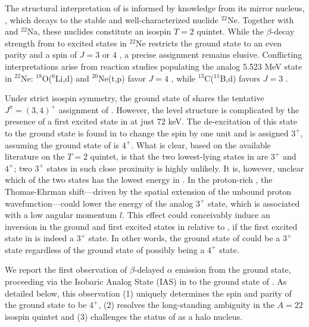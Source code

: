 \documentclass[

reprint,

superscriptaddress,









amsmath,amssymb,
aps,






floatfix,
prl
]{revtex4-2}
\begin{document}
The structural interpretation of \alum{} is informed by knowledge from its mirror nucleus, \flor{}, which decays to the stable and well-characterized \cite{Bas15} nuclide $^{22}$Ne.
Together with \magn{} and $^{22}$Na, these nuclides constitute an isospin $T=2$ quintet.
While the $\beta$-decay strength from \flor{} to excited states in $^{22}$Ne restricts the \flor{} ground state to an even parity and a spin of $J=3$ or $4$ \cite{Dav74}, a precise assignment remains elusive.
Conflicting interpretations arise from reaction studies populating the analog 5.523 MeV state in $^{22}$Ne:
$^{18}$O($^{6}$Li,d) and $^{20}$Ne(t,p) favor $J=4$ \cite{Ana77,Mao94}, while $^{13}$C($^{11}$B,d) favors $J=3$ \cite{Sza83}.

Under strict isospin symmetry, the ground state of \alum{} shares the tentative $J^{\pi}=(3,4)^+$ assignment of \flor{}.
However, the level structure is complicated by the presence of a first excited state in \flor{} at just 72 keV.
The de-excitation of this state to the ground state is found in \cite{Lee07} to change the spin by one unit and is assigned $3^+$, assuming the ground state of \flor{} is $4^+$.
What is clear, based on the available literature on the $T=2$ quintet, is that the two lowest-lying states in \flor{} are $3^+$ and $4^+$; two $3^+$ states in such close proximity is highly unlikely.
It is, however, unclear which of the two states has the lowest energy in \flor{}.
In the proton-rich \alum{}, the Thomas-Ehrman shift—driven by the spatial extension of the unbound proton wavefunction—could lower the energy of the analog $3^+$ state, which is associated with a low angular momentum $l$.
This effect could conceivably induce an inversion in the ground and first excited states in \alum{} relative to \flor{}, if the first excited state in \flor{} is indeed a $3^+$ state.
In other words, the ground state of \alum{} could be a $3^+$ state regardless of the ground state of \flor{} possibly being a $4^+$ state.



We report the first observation of $\beta$-delayed $\alpha$ emission from the \alum{} ground state, proceeding via the Isobaric Analog State (IAS) in \magn{} to the ground state of \neon{}.
As detailed below, this observation (1) uniquely determines the spin and parity of the \alum{} ground state to be $4^+$, (2) resolves the long-standing ambiguity in the $A=22$ isospin quintet and (3) challenges the status of \alum{} as a halo nucleus.
\end{document}
